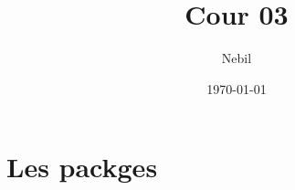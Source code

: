 \documentclass{article}
\begin{document}
\title{Cour 03}
\author{Nebil}
\date{\today}
\maketitle


\section{Les packges}
\end{document}
